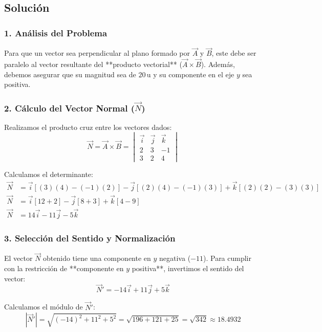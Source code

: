 \documentclass[12pt, a4paper]{article}
\begin{document}
\subsection*{Solución}

\subsubsection*{1. Análisis del Problema}
Para que un vector sea perpendicular al plano formado por $\vec{A}$ y $\vec{B}$, este debe ser paralelo al vector resultante del **producto vectorial** ($\vec{A} \times \vec{B}$). Además, debemos asegurar que su magnitud sea de $20 \, \text{u}$ y su componente en el eje $y$ sea positiva.

\subsubsection*{2. Cálculo del Vector Normal ($\vec{N}$)}
Realizamos el producto cruz entre los vectores dados:
\begin{equation*}
    \vec{N} = \vec{A} \times \vec{B} = \begin{vmatrix} 
    \vec{i} & \vec{j} & \vec{k} \\ 
    2 & 3 & -1 \\ 
    3 & 2 & 4 
    \end{vmatrix}
\end{equation*}

Calculamos el determinante:
\begin{align*}
    \vec{N} &= \vec{i}[(3)(4) - (-1)(2)] - \vec{j}[(2)(4) - (-1)(3)] + \vec{k}[(2)(2) - (3)(3)] \\
    \vec{N} &= \vec{i}[12 + 2] - \vec{j}[8 + 3] + \vec{k}[4 - 9] \\
    \vec{N} &= 14\vec{i} - 11\vec{j} - 5\vec{k}
\end{align*}

\subsubsection*{3. Selección del Sentido y Normalización}
El vector $\vec{N}$ obtenido tiene una componente en $y$ negativa ($-11$). Para cumplir con la restricción de **componente en $y$ positiva**, invertimos el sentido del vector:
$$ \vec{N}' = -14\vec{i} + 11\vec{j} + 5\vec{k} $$

Calculamos el módulo de $\vec{N}'$:
$$ |\vec{N}'| = \sqrt{(-14)^2 + 11^2 + 5^2} = \sqrt{196 + 121 + 25} = \sqrt{342} \approx 18.4932 $$
\end{document}
